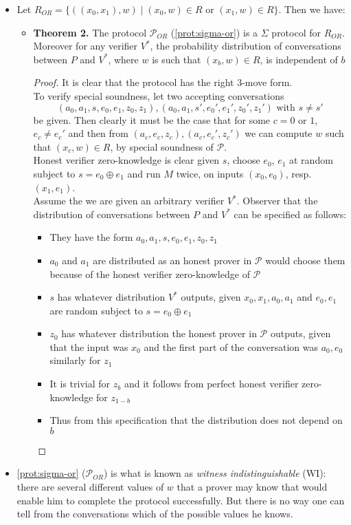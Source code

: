 \begin{itemize}
  \item Let $R_{OR} = \{((x_0,x_1),w) \mid (x_0,w) \in R \text{ or } (x_1,w) \in R\}$. Then we have:
  \begin{itemize}
  	\item \textbf{Theorem 2.} The protocol $\mathcal P_{OR}$ (\autoref{prot:sigma-or}) is a $\Sigma$ protocol for $R_{OR}$. Moreover for any verifier $V^*$, the probability distribution of conversations between $P$ and $V^*$, where $w$ is such that $(x_b, w) \in R$, is independent of $b$
    \begin{proof} 
      It is clear that the protocol has the right 3-move form. \\
      To verify special soundness, let two accepting conversations
      \[
        (a_0,a_1,s,e_0,e_1,z_0,z_1),(a_0,a_1,s',e_0',e_1',z_0',z_1') \text{ with } s \neq s'
      \]
      be given. Then clearly it must be the case that for some $c=0$ or $1$, $e_c \neq e_c'$ and then from $(a_c,e_c,z_c), (a_c,e_c',z_c')$ we can compute $w$ such that $(x_c,w) \in R$, by special soundness of $\mathcal P$. \\
      Honest verifier zero-knowledge is clear given $s$, choose $e_0$, $e_1$ at random subject to $s=e_0  \oplus e_1$ and run $M$ twice, on inputs $(x_0, e_0)$, resp. $(x_1, e_1)$. \\
      Assume the we are given an arbitrary verifier $V^*$. Observer that the distribution of conversations between $P$ and $V^*$ can be specified as follows:
      \begin{itemize}
      	\item They have the form $a_0, a_1, s, e_0, e_1, z_0, z_1$
        \item $a_0$ and $a_1$ are distributed as an honest prover in $\mathcal P$ would choose them because of the honest verifier zero-knowledge of $\mathcal P$
        \item $s$ has whatever distribution $V^*$ outputs, given $x_0,x_1,a_0,a_1$ and $e_0,e_1$ are random subject to $s=e_0 \oplus e_1$
        \item $z_0$ has whatever distribution the honest prover in $\mathcal P$ outputs, given that the input was $x_0$ and the first part of the conversation was $a_0,e_0$ similarly for $z_1$
        \item It is trivial for $z_b$ and it follows from perfect honest verifier zero-knowledge for $z_{1-b}$
        \item Thus from this specification that the distribution does not depend on $b$
      \end{itemize}

    \end{proof}
  \end{itemize}
  \item \autoref{prot:sigma-or} ($\mathcal P_{OR}$) is what is known as \textit{witness indistinguishable} (WI): there are several different values of $w$ that a prover may know that would enable him to complete the protocol successfully. But there is no way one can tell from the conversations which of the possible values he knows.
\end{itemize}


